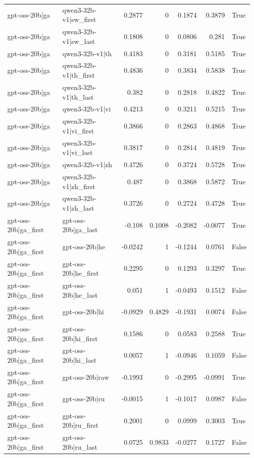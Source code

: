 \begin{table}
\begin{tabular}{l l r r r r l}
gpt-oss-20b|ga & qwen3-32b-v1|sw_first & 0.2877 & 0 & 0.1874 & 0.3879 & True \\
gpt-oss-20b|ga & qwen3-32b-v1|sw_last & 0.1808 & 0 & 0.0806 & 0.281 & True \\
gpt-oss-20b|ga & qwen3-32b-v1|th & 0.4183 & 0 & 0.3181 & 0.5185 & True \\
gpt-oss-20b|ga & qwen3-32b-v1|th_first & 0.4836 & 0 & 0.3834 & 0.5838 & True \\
gpt-oss-20b|ga & qwen3-32b-v1|th_last & 0.382 & 0 & 0.2818 & 0.4822 & True \\
gpt-oss-20b|ga & qwen3-32b-v1|vi & 0.4213 & 0 & 0.3211 & 0.5215 & True \\
gpt-oss-20b|ga & qwen3-32b-v1|vi_first & 0.3866 & 0 & 0.2863 & 0.4868 & True \\
gpt-oss-20b|ga & qwen3-32b-v1|vi_last & 0.3817 & 0 & 0.2814 & 0.4819 & True \\
gpt-oss-20b|ga & qwen3-32b-v1|zh & 0.4726 & 0 & 0.3724 & 0.5728 & True \\
gpt-oss-20b|ga & qwen3-32b-v1|zh_first & 0.487 & 0 & 0.3868 & 0.5872 & True \\
gpt-oss-20b|ga & qwen3-32b-v1|zh_last & 0.3726 & 0 & 0.2724 & 0.4728 & True \\
gpt-oss-20b|ga_first & gpt-oss-20b|ga_last & -0.108 & 0.1008 & -0.2082 & -0.0077 & True \\
gpt-oss-20b|ga_first & gpt-oss-20b|he & -0.0242 & 1 & -0.1244 & 0.0761 & False \\
gpt-oss-20b|ga_first & gpt-oss-20b|he_first & 0.2295 & 0 & 0.1293 & 0.3297 & True \\
gpt-oss-20b|ga_first & gpt-oss-20b|he_last & 0.051 & 1 & -0.0493 & 0.1512 & False \\
gpt-oss-20b|ga_first & gpt-oss-20b|hi & -0.0929 & 0.4829 & -0.1931 & 0.0074 & False \\
gpt-oss-20b|ga_first & gpt-oss-20b|hi_first & 0.1586 & 0 & 0.0583 & 0.2588 & True \\
gpt-oss-20b|ga_first & gpt-oss-20b|hi_last & 0.0057 & 1 & -0.0946 & 0.1059 & False \\
gpt-oss-20b|ga_first & gpt-oss-20b|raw & -0.1993 & 0 & -0.2995 & -0.0991 & True \\
gpt-oss-20b|ga_first & gpt-oss-20b|ru & -0.0015 & 1 & -0.1017 & 0.0987 & False \\
gpt-oss-20b|ga_first & gpt-oss-20b|ru_first & 0.2001 & 0 & 0.0999 & 0.3003 & True \\
gpt-oss-20b|ga_first & gpt-oss-20b|ru_last & 0.0725 & 0.9833 & -0.0277 & 0.1727 & False \\

\end{tabular}
\end{table}
